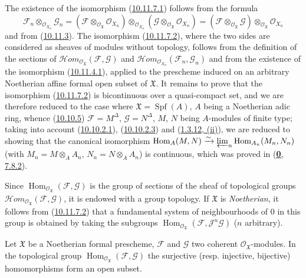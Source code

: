 The existence of the isomorphism
(\hyperref[I.10.11.7.1]{10.11.7.1}) follows from the formula
\[
  \mathscr{F}_n\otimes_{\mathscr{O}_{X_n}}\mathscr{G}_n
  =
  (\mathscr{F}\otimes_{\mathscr{O}_{\mathfrak{X}}}
  \mathscr{O}_{X_n})
  \otimes_{\mathscr{O}_{X_n}}
  (\mathscr{G}\otimes_{\mathscr{O}_{\mathfrak{X}}}
  \mathscr{O}_{X_n})
  =
  (\mathscr{F}\otimes_{\mathscr{O}_{\mathfrak{X}}}\mathscr{G})
  \otimes_{\mathscr{O}_{\mathfrak{X}}}\mathscr{O}_{X_n}
\]
and from (\hyperref[I.10.11.3]{10.11.3}). The isomorphism
(\hyperref[I.10.11.7.2]{10.11.7.2}), where the two sides are
considered as sheaves of modules without topology, follows from the
definition of the sections of
$\mathscr{H}\!om_{\mathscr{O}_{\mathfrak{X}}}
(\mathscr{F},\mathscr{G})$ and
$\mathscr{H}\!om_{\mathscr{O}_{X_n}}(\mathscr{F}_n,\mathscr{G}_n)$ and from
the existence of the isomorphism
(\hyperref[I.10.11.4.1]{10.11.4.1}), applied to the prescheme induced on
an arbitrary Noetherian affine formal open subset of $\mathfrak{X}$. It remains
to prove that the isomorphism
(\hyperref[I.10.11.7.2]{10.11.7.2}) is bicontinuous over a
quasi-compact set, and we are therefore reduced to the case where
$\mathfrak{X}=\operatorname{Spf}(A)$, $A$ being a Noetherian adic ring, whence
(\hyperref[I.10.10.5]{10.10.5})
$\mathscr{F}=M^\Delta$, $\mathscr{G}=N^\Delta$, $M$, $N$ being
$A$-modules of finite type; taking into account
(\hyperref[I.10.10.2.1]{10.10.2.1}),
(\hyperref[I.10.10.2.3]{10.10.2.3}) and
(\hyperref[I.1.3.12]{1.3.12, (ii)}), we are reduced to showing that
the canonical isomorphism
$\operatorname{Hom}_A(M,N)\xrightarrow{\sim}
\varprojlim_n\operatorname{Hom}_{A_n}(M_n,N_n)$ (with
$M_n=M\otimes_A A_n$, $N_n=N\otimes_A A_n$) is continuous, which was
proved in (\hyperref[0.7.8.2]{\textbf{0}, 7.8.2}).

\begin{env}[10.11.8]
\label{I.10.11.8}
Since $\operatorname{Hom}_{\mathscr{O}_{\mathfrak{X}}}
(\mathscr{F},\mathscr{G})$ is the group of sections of the sheaf of
topological groups
$\mathscr{H}\!om_{\mathscr{O}_{\mathfrak{X}}}
(\mathscr{F},\mathscr{G})$, it is endowed with a group topology. If
$\mathfrak{X}$ is \emph{Noetherian}, it follows from
(\hyperref[I.10.11.7.2]{10.11.7.2}) that a fundamental system of
neighbourhoods of $0$ in this group is obtained by taking the subgroups
$\operatorname{Hom}_{\mathscr{O}_{\mathfrak{X}}}
(\mathscr{F},\mathscr{J}^n\mathscr{G})$ ($n$ arbitrary).
\end{env}

\begin{proposition}[10.11.9]
\label{I.10.11.9}
Let $\mathfrak{X}$ be a Noetherian formal prescheme, $\mathscr{F}$ and
$\mathscr{G}$ two coherent $\mathscr{O}_{\mathfrak{X}}$-modules. In
the topological group
$\operatorname{Hom}_{\mathscr{O}_{\mathfrak{X}}}
(\mathscr{F},\mathscr{G})$ the surjective \textup{(resp.}
injective, bijective) homomorphisms form an open subset.
\end{proposition}

